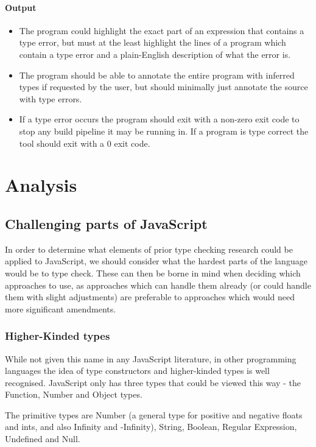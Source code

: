 \documentclass[british, twoside, openright]{bhamthesis}
\theoremstyle{definition}
\begin{document}
  \subsubsection{Output}
  \begin{itemize}
    \item The program could highlight the exact part of an expression that contains a type error, but must at the least highlight the lines of a program which contain a type error and a plain-English description of what the error is.
    \item The program should be able to annotate the entire program with inferred types if requested by the user, but should minimally just annotate the source with type errors.
    \item If a type error occurs the program should exit with a non-zero exit code to stop any build pipeline it may be running in. If a program is type correct the tool should exit with a 0 exit code.
  \end{itemize}

\chapter{Analysis}

  \section{Challenging parts of JavaScript}

    In order to determine what elements of prior type checking research could be applied to JavaScript, we should consider what the hardest parts of the language would be to type check. These can then be borne in mind when deciding which approaches to use, as approaches which can handle them already (or could handle them with slight adjustments) are preferable to approaches which would need more significant amendments.

  \subsection{Higher-Kinded types}
    While not given this name in any JavaScript literature, in other programming languages the idea of type constructors and higher-kinded types is well recognised. JavaScript only has three types that could be viewed this way - the Function, Number and Object types.

    The primitive types are Number (a general type for positive and negative floats and ints, and also Infinity and -Infinity), String, Boolean, Regular Expression, Undefined and Null.
\end{document}
